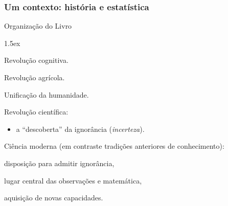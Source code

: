 \documentclass[handout,serif, professionalfont, usenames, dvipsnames, aspectratio = 169]{beamer}\usepackage[]{graphicx}\usepackage[]{color}
\begin{document}
\begin{frame}
  \frametitle{Um contexto: história e estatística}

  Organização do Livro
  \begin{description}
    \itemsep 1.5ex
  \item Revolução cognitiva.
  \item Revolução agrícola.
  \item Unificação da humanidade.
  \item Revolução científica:
    \begin{itemize}
    \item a ``descoberta'' da ignorância (\textit{incerteza}).
    \end{itemize}
  \end{description}
\vspace{0.6cm}

Ciência moderna (em contraste tradições anteriores de conhecimento):
\begin{description}
\item disposição para admitir ignorância,
\item lugar central das observações e matemática,
\item aquisição de novas capacidades.
 \end{description} 

\end{frame}
\end{document}
